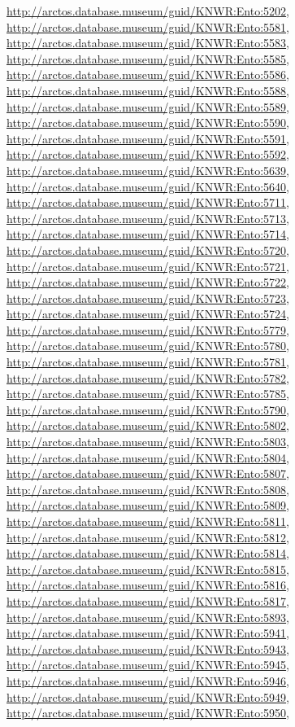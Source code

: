 \documentclass[9pt, article]{memoir}
\begin{document}
\begin{multicols}{2}
\url{http://arctos.database.museum/guid/KNWR:Ento:5202}, 
\url{http://arctos.database.museum/guid/KNWR:Ento:5581}, 
\url{http://arctos.database.museum/guid/KNWR:Ento:5583}, 
\url{http://arctos.database.museum/guid/KNWR:Ento:5585}, 
\url{http://arctos.database.museum/guid/KNWR:Ento:5586}, 
\url{http://arctos.database.museum/guid/KNWR:Ento:5588}, 
\url{http://arctos.database.museum/guid/KNWR:Ento:5589}, 
\url{http://arctos.database.museum/guid/KNWR:Ento:5590}, 
\url{http://arctos.database.museum/guid/KNWR:Ento:5591}, 
\url{http://arctos.database.museum/guid/KNWR:Ento:5592}, 
\url{http://arctos.database.museum/guid/KNWR:Ento:5639}, 
\url{http://arctos.database.museum/guid/KNWR:Ento:5640}, 
\url{http://arctos.database.museum/guid/KNWR:Ento:5711}, 
\url{http://arctos.database.museum/guid/KNWR:Ento:5713}, 
\url{http://arctos.database.museum/guid/KNWR:Ento:5714}, 
\url{http://arctos.database.museum/guid/KNWR:Ento:5720}, 
\url{http://arctos.database.museum/guid/KNWR:Ento:5721}, 
\url{http://arctos.database.museum/guid/KNWR:Ento:5722}, 
\url{http://arctos.database.museum/guid/KNWR:Ento:5723}, 
\url{http://arctos.database.museum/guid/KNWR:Ento:5724}, 
\url{http://arctos.database.museum/guid/KNWR:Ento:5779}, 
\url{http://arctos.database.museum/guid/KNWR:Ento:5780}, 
\url{http://arctos.database.museum/guid/KNWR:Ento:5781}, 
\url{http://arctos.database.museum/guid/KNWR:Ento:5782}, 
\url{http://arctos.database.museum/guid/KNWR:Ento:5785}, 
\url{http://arctos.database.museum/guid/KNWR:Ento:5790}, 
\url{http://arctos.database.museum/guid/KNWR:Ento:5802}, 
\url{http://arctos.database.museum/guid/KNWR:Ento:5803}, 
\url{http://arctos.database.museum/guid/KNWR:Ento:5804}, 
\url{http://arctos.database.museum/guid/KNWR:Ento:5807}, 
\url{http://arctos.database.museum/guid/KNWR:Ento:5808}, 
\url{http://arctos.database.museum/guid/KNWR:Ento:5809}, 
\url{http://arctos.database.museum/guid/KNWR:Ento:5811}, 
\url{http://arctos.database.museum/guid/KNWR:Ento:5812}, 
\url{http://arctos.database.museum/guid/KNWR:Ento:5814}, 
\url{http://arctos.database.museum/guid/KNWR:Ento:5815}, 
\url{http://arctos.database.museum/guid/KNWR:Ento:5816}, 
\url{http://arctos.database.museum/guid/KNWR:Ento:5817}, 
\url{http://arctos.database.museum/guid/KNWR:Ento:5893}, 
\url{http://arctos.database.museum/guid/KNWR:Ento:5941}, 
\url{http://arctos.database.museum/guid/KNWR:Ento:5943}, 
\url{http://arctos.database.museum/guid/KNWR:Ento:5945}, 
\url{http://arctos.database.museum/guid/KNWR:Ento:5946}, 
\url{http://arctos.database.museum/guid/KNWR:Ento:5949}, 
\url{http://arctos.database.museum/guid/KNWR:Ento:5950}, 

\end{multicols}
\end{document}
